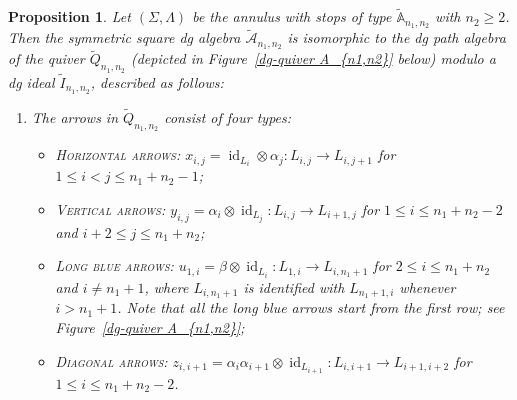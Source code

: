 \documentclass[a4paper, reqno, 11pt]{amsart}
\newtheorem{prop}[theorem]{Proposition}
\theoremstyle{definition}
\begin{document}
	\begin{prop}\label{prop:symsquadg}
		Let $(\Sigma,\Lambda)$ be the annulus with stops of type $\widetilde{\mathbb{A}}_{n_1,n_2}$ with $n_2\geq 2$. Then the symmetric square dg algebra $\widetilde{\mathcal{A}}_{n_1,n_2}$ is isomorphic to the dg  path algebra of the quiver $\widetilde Q_{n_1,n_2}$ (depicted in Figure~\ref{dg-quiver A_{n1,n2}} below) modulo a dg ideal $\widetilde I_{n_1,n_2}$, described as follows:
		\begin{enumerate}[label=(\arabic*), leftmargin=*] 
			\item The arrows in $\widetilde Q_{n_1,n_2}$ consist of four types:
			\begin{itemize}[label=--]
				\item \textsc{Horizontal arrows}: 
				\(
				x_{i,j}= \operatorname{id}_{L_i} \otimes \alpha_j 
				\colon L_{i,j} \longrightarrow L_{i,j+1}
				\) for \(1\leq i<j\leq n_1+n_2-1\);
				\item \textsc{Vertical arrows}: 
				\(
				y_{i,j}= \alpha_i \otimes \operatorname{id}_{L_j} 
				\colon  L_{i,j} \longrightarrow L_{i+1,j}
				\) for \(1\leq i\leq n_1+n_2-2\) and \(i+2\leq j\leq n_1+n_2\);
				\item \textsc{Long blue arrows}: 
				\(
				u_{1,i}= \beta \otimes \operatorname{id}_{L_i} 
				\colon L_{1,i} \longrightarrow L_{i,n_1+1}
				\) for \(2\leq i\leq n_1+n_2\) and \(i\neq n_1+1\), where \(L_{i,n_1+1}\) is identified with \(L_{n_1+1,i}\) whenever \(i>n_1+1\). Note that all the long blue arrows start from the first row; see Figure~\ref{dg-quiver A_{n1,n2}};
				\item \textsc{Diagonal arrows}: 
				\(
				z_{i,i+1}= \alpha_i\alpha_{i+1} \otimes \operatorname{id}_{L_{i+1}} 
				\colon L_{i,i+1} \longrightarrow L_{i+1,i+2}
				\) for \(1\leq i\leq n_1+n_2-2\).
			\end{itemize}
			

\end{enumerate}
\end{prop}
\end{document}
